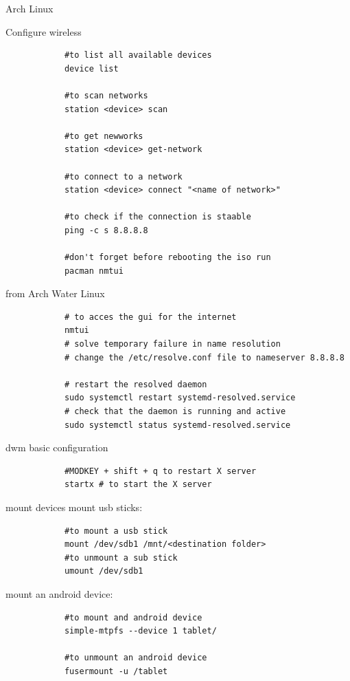 \begin{section}{Arch Linux}
\begin{subsection}{Configure wireless}
\begin{verbatim}
			#to list all available devices
			device list

			#to scan networks
			station <device> scan

			#to get newworks
			station <device> get-network

			#to connect to a network
			station <device> connect "<name of network>"

			#to check if the connection is staable
			ping -c s 8.8.8.8

			#don't forget before rebooting the iso run
			pacman nmtui
		\end{verbatim}
		from Arch Water Linux
		\begin{verbatim}
			# to acces the gui for the internet
			nmtui
			# solve temporary failure in name resolution
			# change the /etc/resolve.conf file to nameserver 8.8.8.8

			# restart the resolved daemon
			sudo systemctl restart systemd-resolved.service
			# check that the daemon is running and active
			sudo systemctl status systemd-resolved.service
		\end{verbatim}

		dwm basic configuration
		\begin{verbatim}
			#MODKEY + shift + q to restart X server
			startx # to start the X server
		\end{verbatim}

	\end{subsection}
	\begin{subsection}{mount devices}
		mount usb sticks:
		\begin{verbatim}
			#to mount a usb stick
			mount /dev/sdb1 /mnt/<destination folder>
			#to unmount a sub stick
			umount /dev/sdb1
		\end{verbatim}
		mount an android device:
		\begin{verbatim}
			#to mount and android device
			simple-mtpfs --device 1 tablet/

			#to unmount an android device
			fusermount -u /tablet


\end{verbatim}
\end{subsection}
\end{section}
